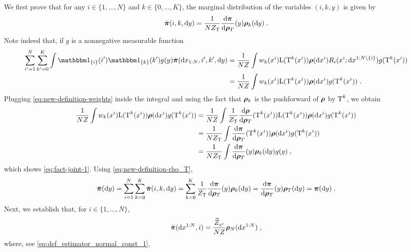 We first prove that for any $i \in \{1,\dots,N\}$ and $k \in \{0,\dots,K\}$, the marginal distribution of the variables $(i,k,y)$ is given by
\begin{equation}
\label{eq:fact-joint-1}
\bar{\boldsymbol{\pi}}(i,k,\mathrm{d} y) = \frac{1}{NZ_{\operatorname{T}}} \frac{\mathrm{d} \boldsymbol{\pi}}{\mathrm{d} \boldsymbol{\rho}_T}(y) \boldsymbol{\rho}_k(\mathrm{d} y) \;.
\end{equation}
Note indeed that, if $g$ is a nonnegative measurable function
\begin{align*}
\sum_{i'=1}^N \sum_{k'=0}^{K} \int \indiacc{i}(i') \indiacc{k}(k') g(y) \bmeaspi(\rmd \chunk{x}{1}{N}, i', k', \rmd y) &= \frac{1}{N \const} \int \w_k(x^i) \likelihood(\transfo^k(x^i)) \measprop(\rmd x^i) R_i(x^i;\rmd \chunkum{x}{1}{N}{i}) g(\transfo^k(x^i)) \\
&= \frac{1}{N \const} \int \w_k(x^i) \likelihood(\transfo^k(x^i)) \measprop(\rmd x^i)  g(\transfo^k(x^i)) \eqsp.
\end{align*}
Plugging \eqref{eq:new-definition-weights} inside the integral and using the fact that $\boldsymbol{\rho}_k$ is the pushforward of $\boldsymbol{\rho}$ by $\operatorname{T}^k$, we obtain
\begin{align*}
 \frac{1}{N Z} \int w_k(x^i) \mathrm{L}(\operatorname{T}^k(x^i)) \boldsymbol{\rho}(\mathrm{d} x^i)  g(\operatorname{T}^k(x^i)) &  = \frac{1}{N Z} \int \frac{1}{Z_{\operatorname{T}}} \frac{\mathrm{d} \boldsymbol{\rho}}{\mathrm{d} \boldsymbol{\rho}_T}(\operatorname{T}^k(x^i)) \mathrm{L}(\operatorname{T}^k(x^i)) \boldsymbol{\rho}(\mathrm{d} x^i) g(\operatorname{T}^k(x^i)) \\
& = \frac{1}{N Z_{\operatorname{T}}} \int \frac{\mathrm{d} \boldsymbol{\pi}}{\mathrm{d} \boldsymbol{\rho}_T}(\operatorname{T}^k(x^i)) \boldsymbol{\rho}(\mathrm{d} x^i) g(\operatorname{T}^k(x^i)) \\
&  = \frac{1}{N Z_{\operatorname{T}}} \int \frac{\mathrm{d} \boldsymbol{\pi}}{\mathrm{d} \boldsymbol{\rho}_T}(y) \boldsymbol{\rho}_k(\mathrm{d} y) g(y) \;,
\end{align*}
which shows \eqref{eq:fact-joint-1}. Using \eqref{eq:new-definition-rho_T},
\begin{equation}
\label{eq:fact-joint-1-cor}
\bar{\boldsymbol{\pi}}(\mathrm{d} y)
= \sum_{i=1}^N \sum_{k=0}^K \bar{\boldsymbol{\pi}}(i,k,\mathrm{d} y) =  \sum_{k=0}^K   \frac{1}{Z_{\operatorname{T}}} \frac{\mathrm{d} \boldsymbol{\pi}}{\mathrm{d} \boldsymbol{\rho}_T}(y) \boldsymbol{\rho}_k(\mathrm{d} y) =  \frac{\mathrm{d} \boldsymbol{\pi}}{\mathrm{d} \boldsymbol{\rho}_T}(y) \boldsymbol{\rho}_T(\mathrm{d} y)= \boldsymbol{\pi}(\mathrm{d} y) \;.
\end{equation}
Next, we establish that, for $i \in \{1,\dots,N\}$,
\begin{equation}
\label{eq:fact-joint-2}
\bar{\boldsymbol{\pi}}(\mathrm{d} x^{1:N},i)= \frac{\widehat{Z}_{x^i}}{N Z}  \boldsymbol{\rho}_N(\mathrm{d} x^{1:N}) \;,
\end{equation}
where, see \eqref{eq:def_estimator_normal_const_1},
